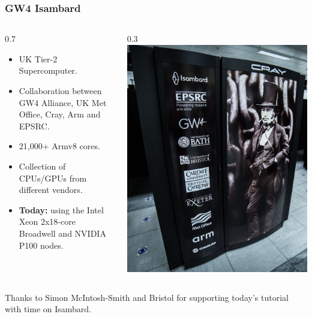 \documentclass[aspectratio=169]{beamer}
\begin{document}
\begin{frame}
\frametitle{GW4 Isambard}
\begin{columns}
  \begin{column}{0.7\framewidth}
    \begin{itemize}
      \item UK Tier-2 Supercomputer.
      \item Collaboration between GW4 Alliance, UK Met Office, Cray, Arm and EPSRC.
      \item 21,000+ Armv8 cores.
      \item Collection of CPUs/GPUs from different vendors.
      \item \textbf{Today:} using the Intel Xeon 2x18-core Broadwell and NVIDIA P100 nodes.
    \end{itemize}
  \end{column}
  \begin{column}{0.3\framewidth}
    \includegraphics[width=\textwidth]{isambard.jpeg}
  \end{column}
\end{columns}

Thanks to Simon McIntosh-Smith and Bristol for supporting today's tutorial with time on Isambard.

\end{frame}
\end{document}
